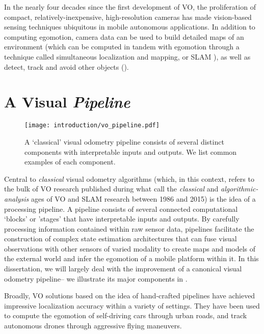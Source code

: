  
In the nearly four decades since the first development of VO, the proliferation of compact, relatively-inexpensive, high-resolution cameras has made vision-based sensing techniques ubiquitous in mobile autonomous applications. In addition to computing egomotion, camera data can be used to build detailed maps of an environment (which can be computed in tandem with egomotion through a technique called simultaneous localization and mapping, or SLAM \citep{Cadena2016-ds}), as well as detect, track and avoid other objects (). 

\section{A Visual \textit{Pipeline}}

\begin{figure}
\begin{center}
		\texttt{[image: introduction/vo\_pipeline.pdf]}
		\caption{A `classical' visual odometry pipeline consists of several distinct components with interpretable inputs and outputs. We list common examples of each component. }
  	\label{fig:intro_vo_pipeline}
\end{center}
\end{figure}


Central to \textit{classical} visual odometry algorithms (which, in this context, refers to the bulk of VO research published during what \cite{Cadena2016-ds} call the \textit{classical} and \textit{algorithmic-analysis} ages of VO and SLAM research between 1986 and 2015) is the idea of a processing pipeline. A  pipeline consists of several connected computational `blocks' or 'stages' that have interpretable inputs and outputs.  By carefully processing information contained within raw sensor data, pipelines facilitate the construction of complex state estimation architectures that can fuse visual observations with other sensors of varied modality to create maps and models of the external world and infer the egomotion of a mobile platform within it. In this dissertation, we will largely deal with the improvement of a canonical visual odometry pipeline-- we illustrate its major components in . 

Broadly, VO solutions based on the idea of hand-crafted pipelines \citep{Leutenegger2015-fk, Cvisic2015-mt, Tsotsos2015, Alcantarilla2016-kv, forster2014svo, wang_stereo_2017, engel_direct_2018} have achieved impressive localization accuracy within a variety of settings. They have been used to compute the egomotion of self-driving cars through urban roads, and track autonomous drones through aggressive flying maneuvers. 

